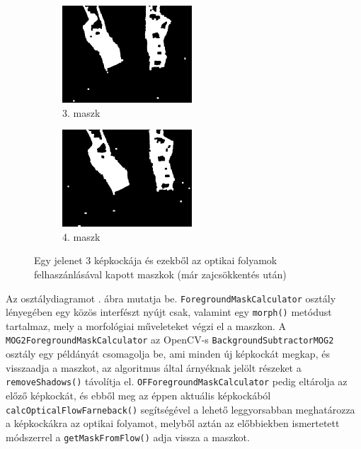 \begin{figure}[tbh]
\begin{subfigure}[b]{.32\linewidth}
	\centering
	\includegraphics[width=137pt]{figures/mask_ofmask_104.png}
	\caption{3. maszk}
  \end{subfigure}
\begin{subfigure}[b]{.32\linewidth}
	\centering
	\includegraphics[width=137pt]{figures/mask_ofmask_107.png}
	\caption{4. maszk}
  \end{subfigure}
\caption{Egy jelenet 3 képkockája és ezekből az optikai folyamok felhaszánlásával kapott maszkok (már zajcsökkentés után) \label{fig:of_mask}}
\end{figure}


Az osztálydiagramot . ábra mutatja be. \texttt{ForegroundMaskCalculator} osztály lényegében egy közös interfészt nyújt csak, valamint egy \texttt{morph()} metódust tartalmaz, mely a morfológiai műveleteket végzi el a maszkon. A \texttt{MOG2ForegroundMaskCalculator} az OpenCV-s \texttt{BackgroundSubtractorMOG2} osztály egy példányát csomagolja be, ami minden új képkockát megkap, és visszaadja a maszkot, az algoritmus által árnyéknak jelölt részeket a \texttt{removeShadows()} távolítja el. \texttt{OFForegroundMaskCalculator} pedig eltárolja az előző képkockát, és ebből meg az éppen aktuális képkockából \texttt{calcOpticalFlowFarneback()} segítségével a lehető leggyorsabban meghatározza a képkockákra az optikai folyamot, melyből aztán az előbbiekben ismertetett módszerrel a \texttt{getMaskFromFlow()} adja vissza a maszkot.

